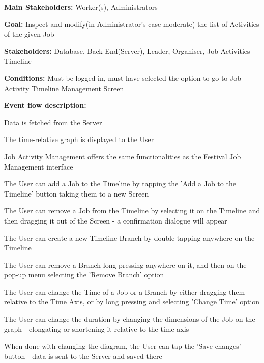 			\noindent {}
			\begin{packed_item}
				\item \textbf{Main Stakeholders:} Worker(s), Administrators
				\item \textbf{Goal:} Inspect and modify(in Administrator's case moderate) the list of Activities of the given Job
				\item \textbf{Stakeholders: } Database, Back-End(Server), Leader, Organiser, Job Activities Timeline
				\item \textbf{Conditions: } Must be logged in, must have selected the option to go to Job Activity Timeline Management Screen
				\item \textbf{Event flow description: }
				\begin{packed_enum}
					\item Data is fetched from the Server
					\item The time-relative graph is displayed to the User
					\item Job Activity Management offers the same functionalities as the Festival Job Management interface
					\item The User can add a Job to the Timeline by tapping the 'Add a Job to the Timeline' button taking them to a new Screen
					\item The User can remove a Job from the Timeline by selecting it on the Timeline and then dragging it out of the Screen - a confirmation dialogue will appear
					\item The User can create a new Timeline Branch by double tapping anywhere on the Timeline
					\item The User can remove a Branch long pressing anywhere on it, and then on the pop-up menu selecting the 'Remove Branch' option
					\item The User can change the Time of a Job or a Branch by either dragging them relative to the Time Axis, or by long pressing and selecting 'Change Time' option
					\item The User can change the duration by changing the dimensions of the Job on the graph - elongating or shortening it relative to the time axis
					\item When done with changing the diagram, the User can tap the 'Save changes' button - data is sent to the Server and saved there
					\item 
				\end{packed_enum}
				

\end{packed_item}
